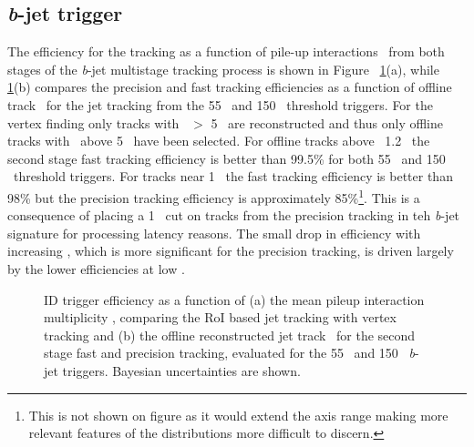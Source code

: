 		\subsection*{\textit{b}-jet trigger}
		The efficiency for the tracking as a function of pile-up interactions \mubar\ from both stages of the \textit{b}-jet multistage tracking process is shown in Figure ~\ref{fig:bjet_idtrig_eff}(a), while \ref{fig:bjet_idtrig_eff}(b) compares the precision and fast tracking efficiencies as a function of offline track \pt\ for the jet tracking from the 55 \gev\ and 150 \gev\ threshold triggers. For the vertex finding only tracks with \pt\ $>$ 5 \gev\ are reconstructed and thus only offline tracks with \pt\ above 5 \gev\ have been selected. For offline tracks above ~1.2 \gev\ the second stage fast tracking efficiency is better than 99.5\% for both 55 \gev\ and 150 \gev\ threshold triggers. For tracks near 1 \gev\ the fast tracking efficiency is better than 98\% but the precision tracking efficiency is approximately 85\%\footnote{This is not shown on figure as it would extend the axis range making more relevant features of the distributions more difficult to discern.}. This is a consequence of placing a 1 \gev\ cut on tracks from the precision tracking in teh \textit{b}-jet signature for processing latency reasons. The small drop in efficiency with increasing \mubar, which is more significant for the precision tracking, is driven largely by the lower efficiencies at low \pt.  
		\begin{figure}[!htb]
	\begin{center}
		\hspace{0.03\textwidth}
			\hspace{0.03\textwidth}
	\end{center}	
	\caption{\ac{ID} trigger efficiency as a function of (a) the mean pileup interaction multiplicity \mubar, comparing the \ac{RoI} based jet tracking with vertex tracking and (b) the offline reconstructed jet track \pt\ for the second stage fast and precision tracking, evaluated for the 55 \gev\ and 150 \gev\ \textit{b}-jet triggers. Bayesian uncertainties are shown.}
	\label{fig:bjet_idtrig_eff}
	\end{figure}	
	
